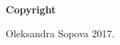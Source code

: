 
\newpage

\thispagestyle{empty}

\vspace*{0.9cm}

\begin{center}

{\bf \Huge Copyright}

\vspace{1cm}


   \Large \textcopyright  Oleksandra Sopova 2017.\\

   \vspace{0.5cm}

   \vspace{0.5cm}

\end{center}
